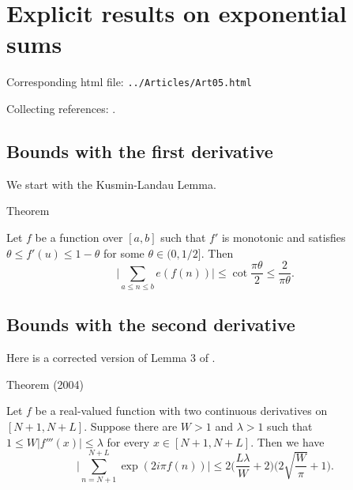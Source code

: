 \chapter{   Explicit results on exponential sums}

Corresponding html file: \texttt{../Articles/Art05.html}










Collecting references:
\cite{Daboussi-Rivat*01}.



 
 


\par 
\section{Bounds with the first derivative}


We start with the Kusmin-Landau Lemma.
\par 
\begin{thm}{Theorem}

    Let $f$ be a function over $[a, b]$ such that $f'$ is monotonic
    and satisfies $\theta \le f'(u)\le 1-\theta$ for some $\theta
    \in(0,1/2]$. Then
    $$
    \biggl|\sum_{a\le n\le b} e(f(n))\biggr|
    \le
    \cot\frac{\pi\theta}{2}\le \frac{2}{\pi \theta}.
    $$
\end{thm}



\par 
\section{Bounds with the second derivative}


  Here is a corrected version of Lemma 3 of
  \cite{Cheng-Graham*01}.
\par 
\begin{thm}{Theorem (2004)}

  Let $f$ be a real-valued function with two continuous derivatives
  on $[N+1, N+L]$. Suppose there are $W > 1$ and $\lambda > 1$ such
  that $1 \le W |f'''(x)| \le \lambda$ for every $x\in [N+1,
  N+L]$. Then we have
  $$
  \biggl|\sum_{n= N+1}^{N+L}
  \exp( 2i\pi f(n)) \biggr|
  \le 2\biggl(\frac{L \lambda}{W} +2\biggr)
  \biggl(2\sqrt{\frac{W}{\pi}} + 1\biggr).
  $$
\end{thm}



